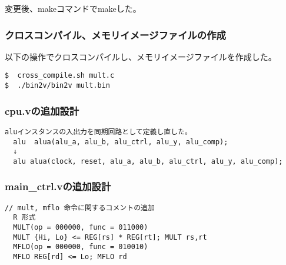 変更後、makeコマンドでmakeした。

\subsubsection{クロスコンパイル、メモリイメージファイルの作成}
以下の操作でクロスコンパイルし、メモリイメージファイルを作成した。
\begin{lstlisting}[caption={クロスコンパイル、メモリイメージファイルの作成},label={クロスコンパイル、メモリイメージファイルの作成9}]
$  cross_compile.sh mult.c
$  ./bin2v/bin2v mult.bin
\end{lstlisting}

\subsubsection{cpu.vの追加設計}
\begin{lstlisting}[caption={cpu.vの変更},label={cpu.vの変更9}]
  aluインスタンスの入出力を同期回路として定義し直した。
  alu  alua(alu_a, alu_b, alu_ctrl, alu_y, alu_comp);
  ↓
  alu alua(clock, reset, alu_a, alu_b, alu_ctrl, alu_y, alu_comp);
\end{lstlisting}

\subsubsection{main\_ctrl.vの追加設計}
\begin{lstlisting}[caption={main\_ctri.vの変更},label={mainctri.vの変更9}]
  // mult, mflo 命令に関するコメントの追加
  R 形式
  MULT(op = 000000, func = 011000)
  MULT {Hi, Lo} <= REG[rs] * REG[rt]; MULT rs,rt
  MFLO(op = 000000, func = 010010)
  MFLO REG[rd] <= Lo; MFLO rd
\end{lstlisting}

